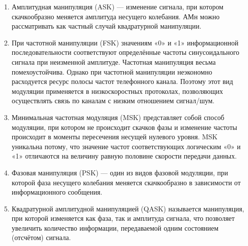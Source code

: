 \documentclass[10pt,a4paper]{report}
\begin{document}
\begin{enumerate}
\item Амплитудная манипуляция (ASK) — изменение сигнала, при котором скачкообразно меняется амплитуда несущего колебания. АМн можно рассматривать как частный случай квадратурной манипуляции.
\item При частотной манипуляции (FSK) значениям «0» и «1» информационной последовательности соответствуют определённые частоты синусоидального сигнала при неизменной амплитуде. Частотная манипуляция весьма помехоустойчива. Однако при частотной манипуляции неэкономно расходуется ресурс полосы частот телефонного канала. Поэтому этот вид модуляции применяется в низкоскоростных протоколах, позволяющих осуществлять связь по каналам с низким отношением сигнал/шум.
\item Минимальная частотная модуляция (MSK) представляет собой способ модуляции, при котором не происходит скачков фазы и изменение частоты происходит в моменты пересечения несущей нулевого уровня. MSK уникальна потому, что значение частот соответствующих логическим «0» и «1» отличаются на величину равную половине скорости передачи данных.
\item Фазовая манипуляция (PSK) — один из видов фазовой модуляции, при которой фаза несущего колебания меняется скачкообразно в зависимости от информационного сообщения.
\item Квадратурной амплитудной манипуляцией (QASK) называется манипуляция, при которой изменяется как фаза, так и амплитуда сигнала, что позволяет увеличить количество информации, передаваемой одним состоянием (отсчётом) сигнала. 
\end{enumerate}
\end{document}
